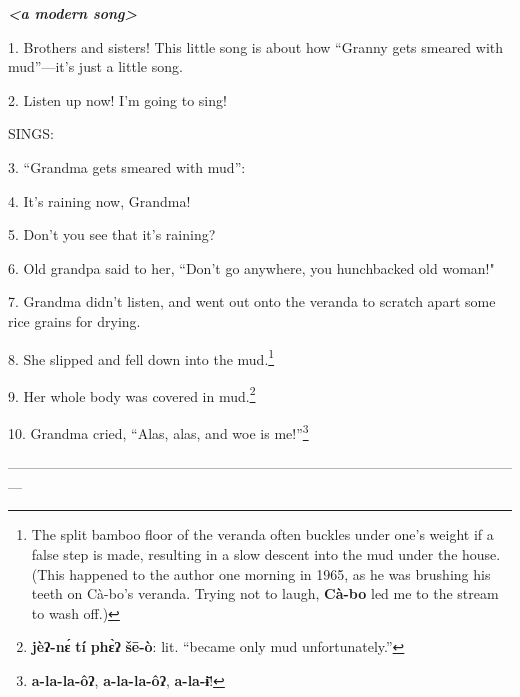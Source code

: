 \setcounter{footnote}{0}

\textit{\textbf{<a modern song>}}

1. Brothers and sisters! This little song is about how ``Granny gets smeared with
mud''---it's just a little song.

2. Listen up now! I'm going to sing!

SINGS:

3. ``Grandma gets smeared with mud'':

4. It's raining now, Grandma!

5. Don't you see that it's raining?

6. Old grandpa said to her, ``Don't go anywhere, you hunchbacked old woman!"

7. Grandma didn't listen, and went out onto the veranda to scratch apart some rice
grains for drying.

8. She slipped and fell down into the mud.\footnote{The split bamboo floor of the veranda often buckles under one's weight if a false step is made, resulting in a slow descent into the mud under the house. (This happened to the author one morning in 1965, as he was brushing his teeth on Cà-bo's veranda. Trying not to laugh, \textbf{Cà-bo} led me to the stream to wash off.)}

9. Her whole body was covered in mud.\footnote{\textbf{jèʔ-nɛ́} \textbf{tí} \textbf{phɛ̀ʔ} \textbf{šē-ò}: lit. ``became only mud unfortunately.''}

10. Grandma cried, ``Alas, alas, and woe is me!''\footnote{\textbf{a-la-la-ôʔ}, \textbf{a-la-la-ôʔ}, \textbf{a-la-ɨ̄}!}

---------------------------------------------------------------------------------------------------------------

